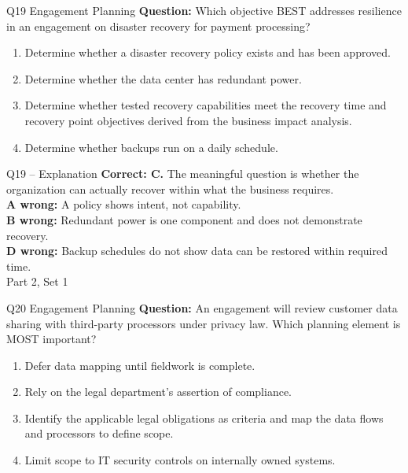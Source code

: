 \documentclass[aspectratio=169,10pt]{beamer}
\begin{document}
\begin{frame}[t]{Q19 \hfill {\scriptsize Engagement Planning}}
	\small
	\textbf{Question:} Which objective BEST addresses resilience in an engagement on disaster recovery for payment processing?
	\begin{enumerate}[label=\Alph*.,itemsep=1pt,topsep=3pt]
			\item Determine whether a disaster recovery policy exists and has been approved.
			\item Determine whether the data center has redundant power.
			\item Determine whether tested recovery capabilities meet the recovery time and recovery point objectives derived from the business impact analysis.
			\item Determine whether backups run on a daily schedule.
	\end{enumerate}
\end{frame}
\begin{frame}[t]{Q19 -- Explanation}
	\footnotesize
	\textbf{Correct: C.} The meaningful question is whether the organization can actually recover within what the business requires. \\[5pt]
\textbf{A wrong:} A policy shows intent, not capability. \\[3pt]
\textbf{B wrong:} Redundant power is one component and does not demonstrate recovery. \\[3pt]
\textbf{D wrong:} Backup schedules do not show data can be restored within required time. \\[3pt]
	\vfill {\tiny Part 2, Set 1}
\end{frame}
\begin{frame}[t]{Q20 \hfill {\scriptsize Engagement Planning}}
	\small
	\textbf{Question:} An engagement will review customer data sharing with third-party processors under privacy law. Which planning element is MOST important?
	\begin{enumerate}[label=\Alph*.,itemsep=1pt,topsep=3pt]
			\item Defer data mapping until fieldwork is complete.
			\item Rely on the legal department's assertion of compliance.
			\item Identify the applicable legal obligations as criteria and map the data flows and processors to define scope.
			\item Limit scope to IT security controls on internally owned systems.
	\end{enumerate}
\end{frame}
\end{document}
